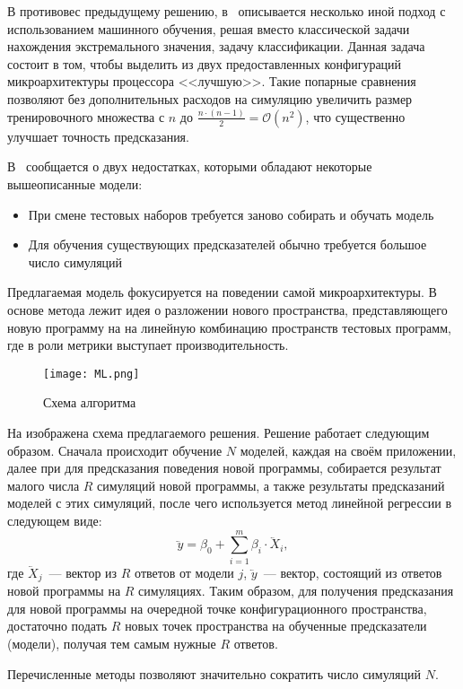 В противовес предыдущему решению, в~\cite{chen2014archranker} описывается несколько иной подход с использованием машинного обучения, решая вместо классической задачи нахождения экстремального значения, задачу классификации. Данная задача состоит в том, чтобы выделить из двух предоставленных конфигураций микроархитектуры процессора <<лучшую>>. Такие попарные сравнения позволяют без дополнительных расходов на симуляцию увеличить размер тренировочного множества с $n$ до $\frac{n\cdot \left(n - 1 \right)}{2} = \mathcal{O}\left(n^2\right)$, что существенно улучшает точность предсказания.

В~\cite{dubach2010empirical} сообщается о двух недостатках, которыми обладают некоторые вышеописанные модели:
\begin{itemize}
  \item При смене тестовых наборов требуется заново собирать и обучать модель
  \item Для обучения существующих предсказателей обычно требуется большое число симуляций
\end{itemize}
Предлагаемая модель фокусируется на поведении самой микроархитектуры. В основе метода лежит идея о разложении нового пространства, представляющего новую программу на на линейную комбинацию пространств тестовых программ, где в роли метрики выступает производительность.
\begin{figure}[!ht]
  \texttt{[image: ML.png]}
  \caption{Схема алгоритма~\cite{dubach2010empirical}}
  \label{fig:empirical}
\end{figure}
На  изображена схема предлагаемого решения. Решение работает следующим образом. Сначала происходит обучение $N$ моделей, каждая на своём приложении, далее при для предсказания  поведения новой программы, собирается результат малого числа $R$ симуляций новой программы, а также результаты предсказаний моделей с этих симуляций, после чего используется метод линейной регрессии в следующем виде:
\[
  \lvec{y} = \beta_0 + \sum_{i = 1}^{m} \beta_i \cdot \lvec{X}_i,
\]
где $\lvec{X}_j$~--- вектор из $R$ ответов от модели $j$, $\lvec{y}$~--- вектор, состоящий из ответов новой программы на $R$ симуляциях. Таким образом, для получения предсказания для новой программы на очередной точке конфигурационного пространства, достаточно подать $R$ новых точек пространства на обученные предсказатели (модели), получая тем самым нужные $R$ ответов.

Перечисленные методы позволяют значительно сократить число симуляций $N$.


